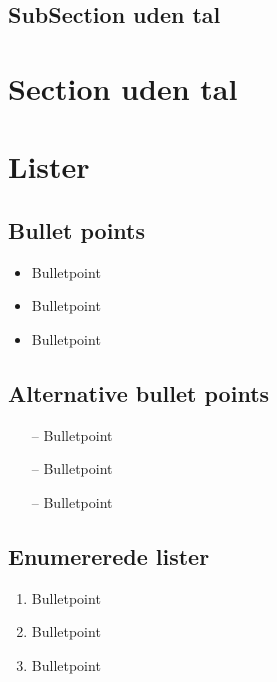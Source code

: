 \documentclass{article}
\begin{document}
    \subsection*{SubSection uden tal}
    \section*{Section uden tal}
\newpage
    \section{Lister}
    \subsection{Bullet points}
    \begin{itemize}
        \item Bulletpoint
        \item Bulletpoint
        \item Bulletpoint
    \end{itemize}
    \subsection{Alternative bullet points}
    \begin{itemize}
        \item[--] Bulletpoint
        \item[--] Bulletpoint
        \item[--] Bulletpoint
    \end{itemize}
    \subsection{Enumererede lister}
    \begin{enumerate}[label=(\alph*)]
        \item Bulletpoint
        \item Bulletpoint
        \item Bulletpoint
    \end{enumerate}
\newpage
\end{document}
